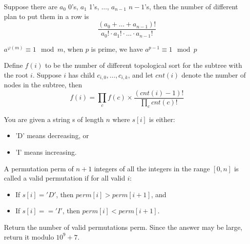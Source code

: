 \documentclass[11pt]{article}
\begin{document}
\begin{problem}[]
Suppose there are \(a_0\) 0's, \(a_1\) 1's, \(\dots\), \(a_{n-1}\) \(n-1\)'s, then the number of
different plan to put them in a row is
\begin{equation*}
\frac{(a_0+\dots+a_{n-1})!}{a_0!\cdot a_1!\cdot\dots\cdot a_{n-1}!}
\end{equation*}

\(a^{\varphi(m)}\equiv 1\mod m\), when \(p\) is prime, we have \(a^{p-1}\equiv 1\mod p\)

Define \(f(i)\) to be the number of different topological sort for the subtree with the
root \(i\). Suppose \(i\) has child \(c_{i,0},\dots,c_{i,k}\), and let \(cnt(i)\) denote the number of
nodes in the subtree, then
\begin{equation*}
f(i)=\prod_cf(c)\times\frac{(cnt(i)-1)!}{\prod_ccnt(c)!}
\end{equation*}
\end{problem}

\begin{problem}
You are given a string s of length \(n\) where \(s[i]\) is either:
\begin{itemize}
\item 'D' means decreasing, or
\item 'I' means increasing.
\end{itemize}
A permutation perm of \(n + 1\) integers of all the integers in the range \([0, n]\) is called a valid
permutation if for all valid \(i\):
\begin{itemize}
\item If \(s[i]='D'\), then \(perm[i] > perm[i + 1]\), and
\item If \(s[i] == 'I'\), then \(perm[i] < perm[i + 1]\).
\end{itemize}
Return the number of valid permutations perm. Since the answer may be large, return it modulo \(10^9 + 7\).
\end{problem}
\end{document}
